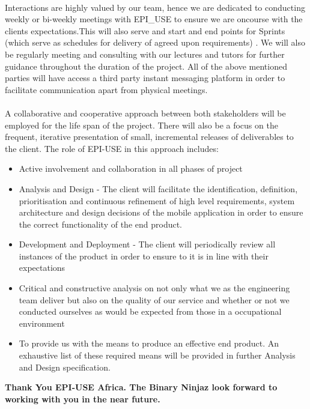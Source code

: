 \documentclass[11pt]{article}
\begin{document}
\paragraph{} \newline
Interactions are highly valued by our team, hence we are dedicated to conducting weekly or bi-weekly meetings with EPI\_USE to ensure we are oncourse with the clients expectations.This will also serve and start and end points for Sprints (which serve as schedules for delivery of agreed upon requirements) . We will also be regularly meeting and consulting with our lectures and tutors for further guidance throughout the duration of the project. All of the above mentioned parties will have access a third party instant messaging platform in order to facilitate communication apart from physical meetings.


\paragraph{} \newline
A collaborative and cooperative approach between both stakeholders will be employed for the life span of the project. There will also be a focus on the frequent, iterative presentation of small, incremental releases of deliverables to the client. The role of EPI-USE
in this approach includes:
\begin{itemize}
\item Active involvement and collaboration in all phases of project
\item Analysis and Design - The client will facilitate the identification, definition,
prioritisation and continuous refinement of high level requirements, system
architecture and design decisions of the mobile application in order to ensure
the correct functionality of the end product.
\item Development and Deployment - The client will periodically review all instances
of the product in order to ensure to it is in line with their expectations
\item Critical and constructive analysis on not only what we as the engineering team
deliver but also on the quality of our service and whether or not we conducted
ourselves as would be expected from those in a occupational environment
\item To provide us with the means to produce an effective end product. An exhaustive
list of these required means will be provided in further Analysis and Design
specification.
\end{itemize}

\begin{center}
{\sffamily\bfseries
\large Thank You EPI-USE Africa. The Binary Ninjaz look forward to working with you in the near future.
}
\end{center}
\end{document}
